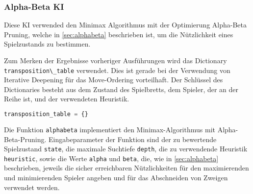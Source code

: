 \hypertarget{alpha-beta-ki}{%
\subsubsection{Alpha-Beta KI}\label{alpha-beta-ki}}

Diese \ac{KI} verwended den Minimax Algorithmus mit der Optimierung
Alpha-Beta Pruning, welche in \autoref{sec:alphabeta} beschrieben ist,
um die Nützlichkeit eines Spielzustands zu bestimmen.

Zum Merken der Ergebnisse vorheriger Ausführungen wird das Dictionary
\passthrough{\lstinline!transposition\_table!} verwendet. Dies ist
gerade bei der Verwendung von Iterative Deepening für das Move-Ordering
vorteilhaft. Der Schlüssel des Dictionaries besteht aus dem Zustand des
Spielbretts, dem Spieler, der an der Reihe ist, und der verwendeten
Heuristik.

\begin{lstlisting}[language=Python]
transposition_table = {}
\end{lstlisting}

Die Funktion \passthrough{\lstinline!alphabeta!} implementiert den
Minimax-Algorithmus mit Alpha-Beta-Pruning. Eingabeparameter der
Funktion sind der zu bewertende Spielzustand
\passthrough{\lstinline!state!}, die maximale Suchtiefe
\passthrough{\lstinline!depth!}, die zu verwendende Heuristik
\passthrough{\lstinline!heuristic!}, sowie die Werte
\passthrough{\lstinline!alpha!} und \passthrough{\lstinline!beta!}, die,
wie in \autoref{sec:alphabeta} beschrieben, jeweils die sicher
erreichbaren Nützlichkeiten für den maximierenden und minimierenden
Spieler angeben und für das Abschneiden von Zweigen verwendet werden.

